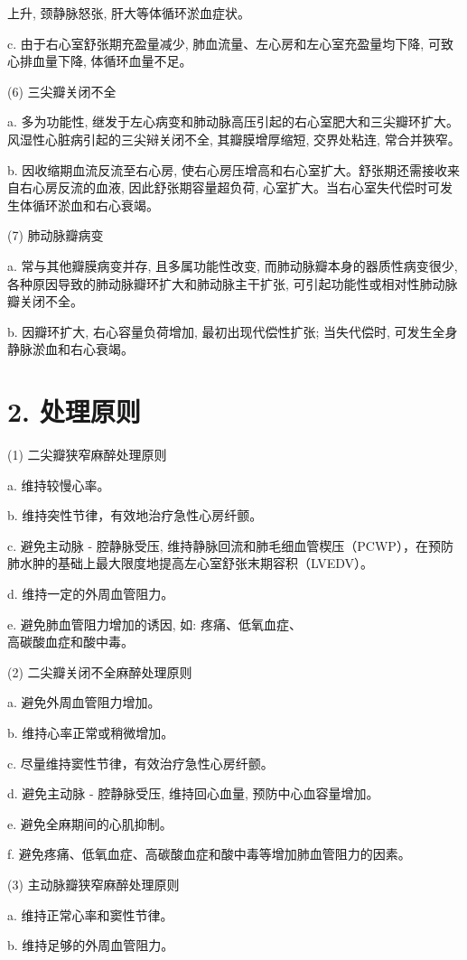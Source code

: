 \documentclass[10pt]{article}
\begin{document}
上升, 颈静脉怒张, 肝大等体循环淤血症状。

c. 由于右心室舒张期充盈量减少, 肺血流量、左心房和左心室充盈量均下降, 可致心排血量下降, 体循环血量不足。

(6) 三尖瓣关闭不全

a. 多为功能性, 继发于左心病变和肺动脉高压引起的右心室肥大和三尖瓣环扩大。风湿性心脏病引起的三尖㦚关闭不全, 其瓣膜增厚缩短, 交界处粘连, 常合并狹窄。

b. 因收缩期血流反流至右心房, 使右心房压增高和右心室扩大。舒张期还需接收来自右心房反流的血液, 因此舒张期容量超负荷, 心室扩大。当右心室失代偿时可发生体循环淤血和右心衰竭。

(7) 肺动脉瓣病变

a. 常与其他瓣膜病变并存, 且多属功能性改变, 而肺动脉瓣本身的器质性病变很少, 各种原因导致的肺动脉瓣环扩大和肺动脉主干扩张, 可引起功能性或相对性肺动脉瓣关闭不全。

b. 因瓣环扩大, 右心容量负荷增加, 最初出现代偿性扩张; 当失代偿时, 可发生全身静脉淤血和右心衰竭。

\section*{2. 处理原则}
(1) 二尖瓣狭窄麻醉处理原则

a. 维持较慢心率。

b. 维持突性节律，有效地治疗急性心房纤颤。

c. 避免主动脉 - 腔静脉受压, 维持静脉回流和肺毛细血管楔压（PCWP），在预防肺水肿的基础上最大限度地提高左心室舒张末期容积（LVEDV）。

d. 维持一定的外周血管阻力。

e. 避免肺血管阻力增加的诱因, 如: 疼痛、低氧血症、\\
高碳酸血症和酸中毒。

(2) 二尖瓣关闭不全麻醉处理原则

a. 避免外周血管阻力增加。

b. 维持心率正常或稍微增加。

c. 尽量维持窦性节律，有效治疗急性心房纤颤。

d. 避免主动脉 - 腔静脉受压, 维持回心血量, 预防中心血容量增加。

e. 避免全麻期间的心肌抑制。

f. 避免疼痛、低氧血症、高碳酸血症和酸中毒等增加肺血管阻力的因素。

(3) 主动脉瓣狭窄麻醉处理原则

a. 维持正常心率和窦性节律。

b. 维持足够的外周血管阻力。
\end{document}

